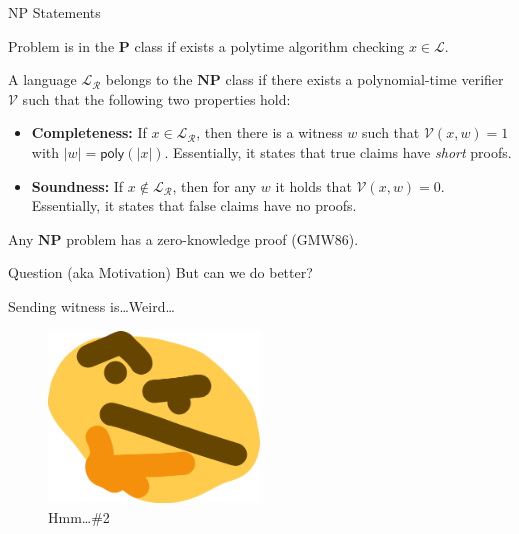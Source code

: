 \documentclass{zkdl-presentation-template}
\begin{document}
    \begin{frame}{NP Statements}
        \begin{definition}[P Language]
            Problem is in the $\mathbf{P}$ class if exists a polytime algorithm checking $x \in \mathcal{L}$.\pause
        \end{definition}

        \begin{definition}[NP Language]
            A language $\mathcal{L}_{\mathcal{R}}$ belongs to the $\mathbf{NP}$ class if there exists a polynomial-time verifier $\mathcal{V}$ such that the following two properties hold:\pause
            \begin{itemize}
                \item \textbf{Completeness:} If $x \in \mathcal{L}_{\mathcal{R}}$, then there is a witness $w$ such that $\mathcal{V}(x, w) = 1$ with $|w| = \mathsf{poly}(|x|)$. Essentially, it states that true claims have \textit{short} proofs.\pause
                \item \textbf{Soundness:} If $x \not\in \mathcal{L}_{\mathcal{R}}$, then for any $w$ it holds that $\mathcal{V}(x, w) = 0$. Essentially, it states that false claims have no proofs.\pause
            \end{itemize}
        \end{definition}

        \begin{theorem}
            Any $\mathbf{NP}$ problem has a zero-knowledge proof (GMW86).
        \end{theorem}
    \end{frame}

    \begin{frame}{Question (aka Motivation)}
        But can we do better?\pause

        Sending witness is\ldots Weird\ldots

        \begin{figure}
            \centering
            \includegraphics[width=0.5\textwidth]{images/lecture_6/thonk.png}
            \caption{Hmm\ldots \#2}
        \end{figure}
    \end{frame}
\end{document}

